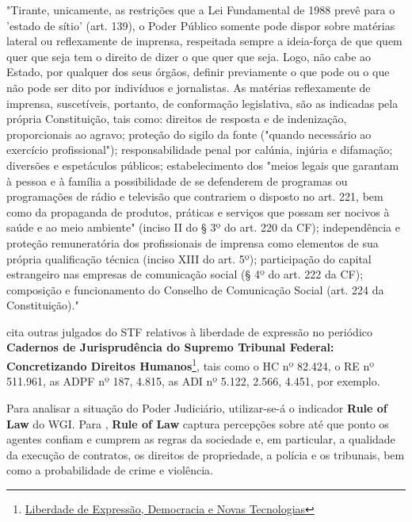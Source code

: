 \noindent
\begin{flushleft}
\setlength{\leftskip}{4cm}
\small
"Tirante, unicamente, as restrições que a Lei Fundamental de 1988 prevê para o 'estado de sítio' (art. 139), o Poder Público somente pode dispor sobre matérias lateral ou reflexamente de imprensa, respeitada sempre a ideia-força de que quem quer que seja tem o direito de dizer o que quer que seja. Logo, não cabe ao Estado, por qualquer dos seus órgãos, definir previamente o que pode ou o que não pode ser dito por indivíduos e jornalistas. As matérias reflexamente de imprensa, suscetíveis, portanto, de conformação legislativa, são as indicadas pela própria Constituição, tais como: direitos de resposta e de indenização, proporcionais ao agravo; proteção do sigilo da fonte ("quando necessário ao exercício profissional"); responsabilidade penal por calúnia, injúria e difamação; diversões e espetáculos
públicos; estabelecimento dos "meios legais que garantam à pessoa e à família a possibilidade de se defenderem de programas ou programações de rádio e televisão que contrariem o disposto no art. 221, bem como da propaganda de produtos, práticas e serviços que possam ser nocivos à saúde e ao meio ambiente" (inciso II do § 3º
do art. 220 da CF); independência e proteção remuneratória dos profissionais de imprensa como elementos de sua própria qualificação técnica (inciso XIII do art. 5º); participação do capital estrangeiro nas empresas de comunicação social (§ 4º do
art. 222 da CF); composição e funcionamento do Conselho de Comunicação Social (art. 224 da Constituição)." \cite{ado26}
\end{flushleft}

\cite{stf_caderno_liberdadeexpressao} cita outras julgados do STF relativos à liberdade de expressão no periódico \textbf{Cadernos de Jurisprudência do Supremo Tribunal Federal: Concretizando Direitos Humanos}\footnote{\href{https://www.cnj.jus.br/wp-content/uploads/2024/12/cadernos-stf-liberdadeexpressaoenovastecnologias.pdf}{Liberdade de Expressão, Democracia e Novas Tecnologias}}, tais como o HC nº 82.424, o RE nº 511.961, as ADPF nº 187, 4.815, as ADI nº 5.122, 2.566, 4.451, por exemplo.

Para analisar a situação do Poder Judiciário, utilizar-se-á o indicador \textbf{Rule of Law} do WGI. Para \cite{wgi_dados}, \textbf{Rule of Law} captura percepções sobre até que ponto os agentes confiam e cumprem as regras da sociedade e, em particular, a qualidade da execução de contratos, os direitos de propriedade, a polícia e os tribunais, bem como a probabilidade de crime e violência.

